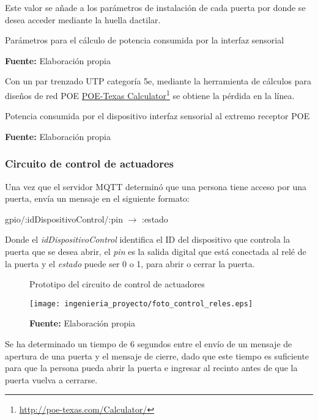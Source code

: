 \documentclass[../principal]{subfiles}
\begin{document}
  Este valor se añade a los parámetros de instalación de cada puerta por donde se desea acceder mediante la huella dactilar.

  \begin{table}[H]
    \centering
    \caption{Parámetros para el cálculo de potencia consumida por la interfaz sensorial}
    
    \caption*{\textbf{Fuente:} Elaboración propia}
  \end{table}

  Con un par trenzado UTP categoría 5e, mediante la herramienta de cálculos para diseños de red POE \href{http://poe-texas.com/Calculator/}{POE-Texas Calculator}\footnote{\href{http://poe-texas.com/Calculator/}{http://poe-texas.com/Calculator/}} se obtiene la pérdida en la línea.

  \begin{table}[H]
    \caption{Potencia consumida por el dispositivo interfaz sensorial al extremo receptor POE}
    \centering
    
    \caption*{\textbf{Fuente:} Elaboración propia}
  \end{table}

  \subsubsection*{Circuito de control de actuadores}

  Una vez que el servidor MQTT determinó que una persona tiene acceso por una puerta, envía un mensaje en el siguiente formato:

  \begin{center}
    gpio/:idDispositivoControl/:pin \quad $ \rightarrow $ \quad :estado
  \end{center}

  Donde el \textit{idDispositivoControl} identifica el ID del dispositivo que controla la puerta que se desea abrir, el \textit{pin} es la salida digital que está conectada al relé de la puerta y el \textit{estado} puede ser 0 o 1, para abrir o cerrar la puerta.

  \begin{figure}[h]
    \centering
    \caption{Prototipo del circuito de control de actuadores}
    \texttt{[image: ingenieria\_proyecto/foto\_control\_reles.eps]}
    \caption*{\textbf{Fuente:} Elaboración propia}
  \end{figure}

  Se ha determinado un tiempo de 6 segundos entre el envío de un mensaje de apertura de una puerta y el mensaje de cierre, dado que este tiempo es suficiente para que la persona pueda abrir la puerta e ingresar al recinto antes de que la puerta vuelva a cerrarse.
\end{document}

